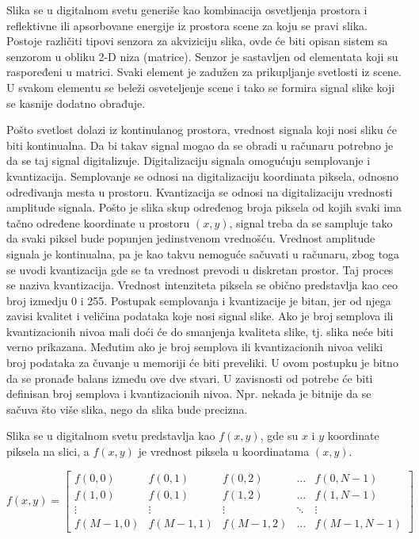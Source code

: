 \documentclass[a4paper,12pt,titlepage]{article}
\begin{document}
Slika se u digitalnom svetu generiše kao kombinacija osvetljenja prostora i reflektivne ili apsorbovane energije iz prostora scene za koju se pravi slika. Postoje različiti tipovi senzora za akviziciju slika, ovde će biti opisan sistem sa senzorom u obliku 2-D niza (matrice). Senzor je sastavljen od elementata koji su raspoređeni u matrici. Svaki element je zadužen za prikupljanje svetlosti iz scene. U svakom elementu se beleži osveteljenje scene i tako se formira signal slike koji se kasnije dodatno obrađuje.

Pošto svetlost dolazi iz kontinulanog prostora, vrednost signala koji nosi sliku će biti kontinualna. Da bi takav signal mogao da se obradi u računaru potrebno je da se taj signal digitalizuje. Digitalizaciju signala omogućuju semplovanje i kvantizacija. Semplovanje se odnosi na digitalizaciju koordinata piksela, odnosno određivanja mesta u prostoru. Kvantizacija se odnosi na digitalizaciju vrednosti amplitude signala. Pošto je slika skup određenog broja piksela od kojih svaki ima tačno određene koordinate u prostoru $(x, y)$, signal treba da se sampluje tako da svaki piksel bude popunjen jedinstvenom vrednošću. Vrednost amplitude signala je kontinualna, pa je kao takvu nemoguće sačuvati u računaru, zbog toga se uvodi kvantizacija gde se ta vrednost prevodi u diskretan prostor. Taj proces se naziva kvantizacija. Vrednost intenziteta piksela se obično predstavlja kao ceo broj izmedju 0 i 255. Postupak semplovanja i kvantizacije je bitan, jer od njega zavisi kvalitet i veličina podataka koje nosi signal slike. Ako je broj semplova ili kvantizacionih nivoa mali doći će do smanjenja kvaliteta slike, tj. slika neće biti verno prikazana. Međutim ako je broj  semplova ili kvantizacionih nivoa veliki broj podataka za čuvanje u memoriji će biti preveliki. U ovom postupku je bitno da se pronađe balans između ove dve stvari. U zavisnosti od potrebe će biti definisan broj semplova i kvantizacionih nivoa. Npr. nekada je bitnije da se sačuva što više slika, nego da slika bude precizna. 

Slika se u digitalnom svetu predstavlja kao $f(x, y)$, gde su $x$ i $y$ koordinate piksela na slici, a $f(x, y)$ je vrednost piksela u koordinatama $(x, y)$.

\begin{equation}\label{eq:slika}
f(x, y)
=
\begin{bmatrix}
    f(0, 0) & f(0, 1) & f(0, 2) & \dots  & f(0, N - 1) \\
    f(1, 0) & f(0, 1) & f(1, 2) & \dots  & f(1, N - 1) \\
    \vdots & \vdots & \vdots & \ddots & \vdots \\
    f(M - 1, 0) & f(M - 1, 1) & f(M - 1, 2) & \dots  & f(M - 1, N - 1)
\end{bmatrix}
\end{equation}
\end{document}
